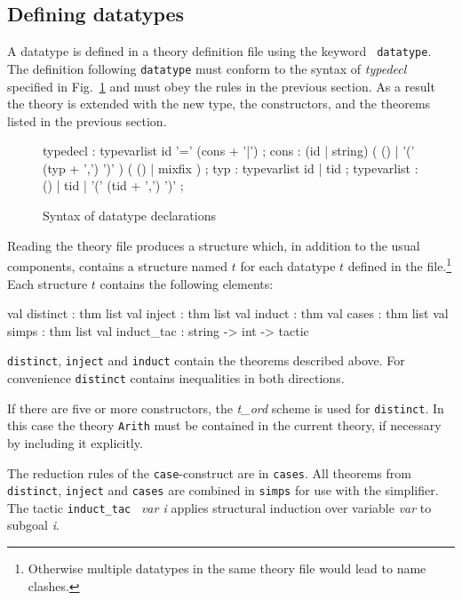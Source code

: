 \subsection{Defining datatypes}

A datatype is defined in a theory definition file using the keyword {\tt
  datatype}. The definition following {\tt datatype} must conform to the
syntax of {\em typedecl} specified in Fig.~\ref{datatype-grammar} and must
obey the rules in the previous section. As a result the theory is extended
with the new type, the constructors, and the theorems listed in the previous
section.

\begin{figure}
\begin{rail}
typedecl : typevarlist id '=' (cons + '|')
         ;
cons     : (id | string) ( () | '(' (typ + ',') ')' ) ( () | mixfix )
         ;
typ      : typevarlist id
           | tid
         ;
typevarlist : () | tid | '(' (tid + ',') ')'
         ;
\end{rail}
\caption{Syntax of datatype declarations}
\label{datatype-grammar}
\end{figure}

Reading the theory file produces a structure which, in addition to the usual
components, contains a structure named $t$ for each datatype $t$ defined in
the file.\footnote{Otherwise multiple datatypes in the same theory file would
  lead to name clashes.} Each structure $t$ contains the following elements:
\begin{ttbox}
val distinct : thm list
val inject : thm list
val induct : thm
val cases : thm list
val simps : thm list
val induct_tac : string -> int -> tactic
\end{ttbox}
{\tt distinct}, {\tt inject} and {\tt induct} contain the theorems described
above. For convenience {\tt distinct} contains inequalities in both
directions.
\begin{warn}
  If there are five or more constructors, the {\em t\_ord} scheme is used for
  {\tt distinct}.  In this case the theory {\tt Arith} must be contained
  in the current theory, if necessary by including it explicitly.
\end{warn}
The reduction rules of the {\tt case}-construct are in {\tt cases}.  All
theorems from {\tt distinct}, {\tt inject} and {\tt cases} are combined in
{\tt simps} for use with the simplifier. The tactic {\verb$induct_tac$~{\em
    var i}\/} applies structural induction over variable {\em var} to
subgoal {\em i}.


